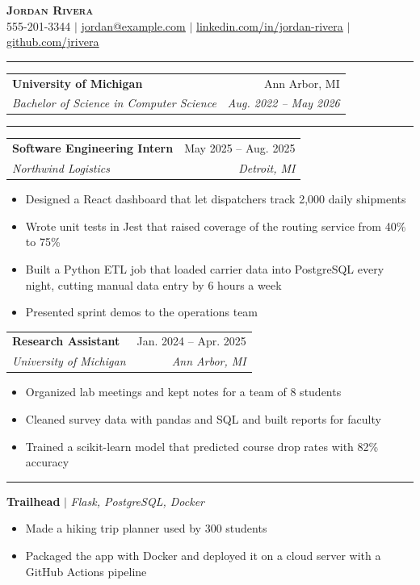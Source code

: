 \documentclass[letterpaper,11pt]{article}
\makeatletter
\renewcommand{\section}[1]{\vspace{4pt}{\large\scshape #1}\par\vspace{-3pt}\rule{\textwidth}{0.4pt}\par\vspace{2pt}}
\newcommand{\resumeItem}[1]{\item\small{#1}}
\newcommand{\resumeSubheading}[4]{
  \item
    \begin{tabular*}{0.97\textwidth}[t]{l@{\extracolsep{\fill}}r}
      \textbf{#1} & #2 \\
      \textit{\small#3} & \textit{\small #4} \\
    \end{tabular*}
}
\newcommand{\resumeSubHeadingListStart}{\begin{list}{}{\setlength{\leftmargin}{0.15in}\setlength{\itemsep}{0pt}\setlength{\topsep}{0pt}}}
\newcommand{\resumeSubHeadingListEnd}{\end{list}}
\newcommand{\resumeItemListStart}{\begin{itemize}\setlength{\itemsep}{-2pt}}
\newcommand{\resumeItemListEnd}{\end{itemize}}
\makeatother
\begin{document}
\begin{center}
    \textbf{\Huge \scshape Jordan Rivera} \\ \vspace{1pt}
    \small 555-201-3344 $|$ \href{mailto:jordan@example.com}{\underline{jordan@example.com}} $|$
    \href{https://linkedin.com/in/jordan-rivera}{\underline{linkedin.com/in/jordan-rivera}} $|$
    \href{https://github.com/jrivera}{\underline{github.com/jrivera}}
\end{center}
\section{Education}
  \resumeSubHeadingListStart
    \resumeSubheading
      {University of Michigan}{Ann Arbor, MI}
      {Bachelor of Science in Computer Science}{Aug. 2022 -- May 2026}
  \resumeSubHeadingListEnd
\section{Experience}
  \resumeSubHeadingListStart
    \resumeSubheading
      {Software Engineering Intern}{May 2025 -- Aug. 2025}
      {Northwind Logistics}{Detroit, MI}
      \resumeItemListStart
        \resumeItem{Designed a React dashboard that let dispatchers track 2,000 daily shipments}
        \resumeItem{Wrote unit tests in Jest that raised coverage of the routing service from 40\% to 75\%}
        \resumeItem{Built a Python ETL job that loaded carrier data into PostgreSQL every night, cutting manual data entry by 6 hours a week}
        \resumeItem{Presented sprint demos to the operations team}
      \resumeItemListEnd
    \resumeSubheading
      {Research Assistant}{Jan. 2024 -- Apr. 2025}
      {University of Michigan}{Ann Arbor, MI}
      \resumeItemListStart
        \resumeItem{Organized lab meetings and kept notes for a team of 8 students}
        \resumeItem{Cleaned survey data with pandas and SQL and built reports for faculty}
        \resumeItem{Trained a scikit-learn model that predicted course drop rates with 82\% accuracy}
      \resumeItemListEnd
  \resumeSubHeadingListEnd
\section{Projects}
    \resumeSubHeadingListStart
      \item
          \textbf{Trailhead} $|$ \emph{Flask, PostgreSQL, Docker}
          \resumeItemListStart
            \resumeItem{Made a hiking trip planner used by 300 students}
            \resumeItem{Packaged the app with Docker and deployed it on a cloud server with a GitHub Actions pipeline}
          \resumeItemListEnd
    \resumeSubHeadingListEnd
\end{document}
